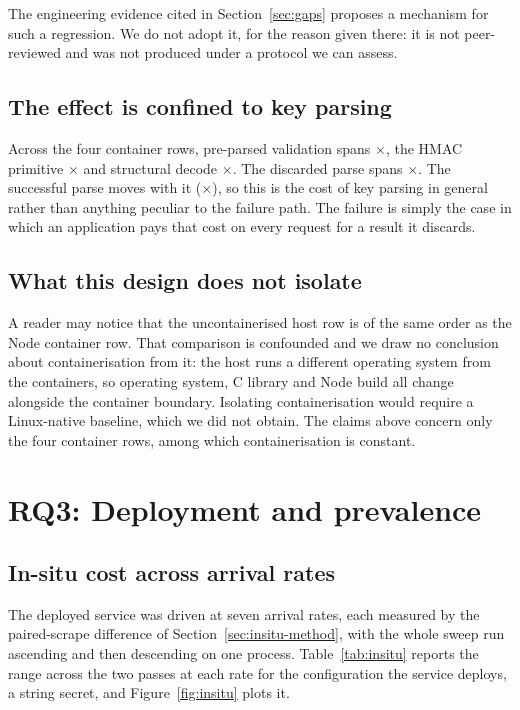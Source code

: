 \documentclass[pdflatex,sn-basic,twocolumn]{sn-jnl}%
\begin{document}
The engineering evidence cited in Section~\ref{sec:gaps} proposes a mechanism for
such a regression. We do not adopt it, for the reason given there: it is not
peer-reviewed and was not produced under a protocol we can assess.

\subsection{The effect is confined to key parsing}

Across the four container rows, pre-parsed validation spans
\SpanJwtPreparsed$\times$, the HMAC primitive \SpanHmacString$\times$ and
structural decode \SpanDecodeOnly$\times$. The discarded parse spans
\SpanProbeThrows$\times$. The successful parse moves with it
(\SpanProbeSucceeds$\times$), so this is the cost of key parsing in general
rather than anything peculiar to the failure path. The failure is simply the case
in which an application pays that cost on every request for a result it discards.

\subsection{What this design does not isolate}

A reader may notice that the uncontainerised host row is of the same order as the
Node \NodeTwentySixGlibcNodeMajor{} container row. That comparison is confounded
and we draw no conclusion about containerisation from it: the host runs a
different operating system from the containers, so operating system, C library
and Node build all change alongside the container boundary. Isolating
containerisation would require a Linux-native baseline, which we did not obtain.
The claims above concern only the four container rows, among which
containerisation is constant.

\section{RQ3: Deployment and prevalence}\label{sec:rq3}

\subsection{In-situ cost across arrival rates}\label{sec:insitu}

The deployed service was driven at seven arrival rates, each measured by the
paired-scrape difference of Section~\ref{sec:insitu-method}, with the whole sweep
run ascending and then descending on one process. Table~\ref{tab:insitu} reports
the range across the two passes at each rate for the configuration the service
deploys, a string secret, and Figure~\ref{fig:insitu} plots it.
\end{document}
